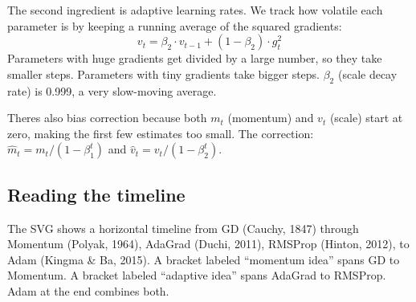 \documentclass[11pt, letterpaper]{article}
\begin{document}
The second ingredient is adaptive learning rates. We track how volatile each parameter is by keeping a running average of the squared gradients:
$$v_t = \beta_2 \cdot v_{t-1} + (1 - \beta_2) \cdot g_t^2$$
Parameters with huge gradients get divided by a large number, so they take smaller steps. Parameters with tiny gradients take bigger steps. $\beta_2$ (scale decay rate) is 0.999, a very slow-moving average.

Theres also bias correction because both $m_t$ (momentum) and $v_t$ (scale) start at zero, making the first few estimates too small. The correction: $\hat{m}_t = m_t / (1 - \beta_1^t)$ and $\hat{v}_t = v_t / (1 - \beta_2^t)$.

\subsection{Reading the timeline}
The SVG shows a horizontal timeline from GD (Cauchy, 1847) through Momentum (Polyak, 1964), AdaGrad (Duchi, 2011), RMSProp (Hinton, 2012), to Adam (Kingma \& Ba, 2015). A bracket labeled ``momentum idea'' spans GD to Momentum. A bracket labeled ``adaptive idea'' spans AdaGrad to RMSProp. Adam at the end combines both.
\end{document}
